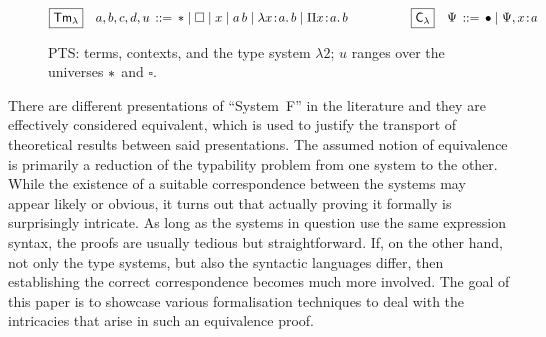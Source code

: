 \documentclass[a4paper,UKenglish]{lipics-v2016}
\makeatletter
\newcommand{\ms}{\,}
\newcommand{\mrel}[1]{\mathrel{\ms #1 \ms}}
\newcommand{\dom}[1]{\ensuremath{\textrm{dom$\,#1$}}}
\newcommand{\OF}{\mrel{:}}
\newcommand{\bnfdef}{\mrel{::=}}
\newcommand{\SysL}{$\lambda2$\xspace}
\newcommand{\TmL}{\ensuremath{\mathsf{Tm_{\lambda}}}}
\newcommand{\CtxL}{\ensuremath{\mathsf{C_{\lambda}}}}
\newcommand{\of}{\ensuremath{\!:\!}}
\newcommand{\raisemath}[1]{\mathpalette{\raisem@th{#1}}}
\newcommand{\raisem@th}[3]{\raisebox{#1}{\ensuremath{#2#3}}}
\newcommand{\tsAnnot}[2]{\vdash\hspace{-.7em}^{\raisemath{1.5pt}{\scriptscriptstyle{#2}}}_{\raisemath{0.3pt}{\scriptscriptstyle{#1}}}} %
\newcommand{\tyL}{\tsAnnot{\lambda}{}} %
\newcommand{\typingL}[3]{\ensuremath{{#1} \mathrel{\tyL} #2 \OF #3}}
\newcommand{\Prp}{\ensuremath{\textrm{\textasteriskcentered}}}
\newcommand{\Typ}{\ensuremath{\square}}
\newcommand{\Lam}[1]{\ensuremath{\lambda #1.\,}}
\newcommand{\Prod}[1]{\ensuremath{\Pi #1.\,}}
\newcommand{\emptyctx}{\ensuremath{\bullet}}
\newcommand{\subst}[1]{\hphantom{|}\!\![{#1}]}
\theoremstyle{plain}
\makeatother
\begin{document}
\begin{figure}[t]
  \begin{center}
    \small
    \begin{align*}
      \Aboxed{\TmL} & a, b, c, d, u &\bnfdef \Prp \mid \Typ \mid x \mid a\,b \mid \Lam{x \of a} b \mid \Prod{x \of a} b & \qquad\qquad\Aboxed{\CtxL} & \Psi &\bnfdef \emptyctx \mid \Psi, x \of a
    \end{align*}
    \vspace{-2.5em}
  \end{center}
  \caption{PTS: terms, contexts, and the type system \SysL; $u$ ranges over the universes $\Prp$ and $\Typ$.\vspace{-1em}}
  \label{fig:sys-l}
\end{figure}

There are different presentations of ``System~F'' in the literature and they are effectively considered equivalent, which is used to justify the transport of theoretical results between said presentations.
The assumed notion of equivalence is primarily a reduction of the typability problem from one system to the other.
While the existence of a suitable correspondence between the systems may appear likely or obvious, it turns out that actually proving it formally is surprisingly intricate.
As long as the systems in question use the same expression syntax, the proofs are usually tedious but straightforward.
If, on the other hand, not only the type systems, but also the syntactic languages differ, then establishing the correct correspondence becomes much more involved.
The goal of this paper is to showcase various formalisation techniques to deal with the intricacies that arise in such an equivalence proof.
\end{document}
